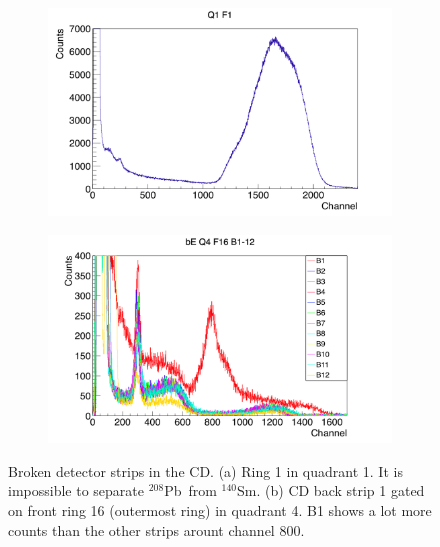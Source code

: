 \documentclass[twoside,english]{uiofysmaster/uiofysmaster}
\newcommand{\Sm}{$^{140}$Sm} %
\newcommand{\Pb}{$^{208}$Pb}
\begin{document}
\begin{figure}[ht]
	\centering
	\begin{subfigure}[t]{0.49\textwidth}
		\centering
		\includegraphics[width=\textwidth]{../Plots/plotting/TB_Q1_F1.png}
		\caption{}
		\label{fig:BDS_R1}
	\end{subfigure}
	\hfill
	\begin{subfigure}[t]{0.49\textwidth}
		\centering
		\includegraphics[width=\textwidth]{../Plots/plotting/bE_Q4_f16_b1-12.png}
		\caption{}
		\label{fig:BDS_B1}
	\end{subfigure}
	\caption{Broken detector strips in the CD.
	(a) Ring 1 in quadrant 1. It is impossible to separate \Pb\ from \Sm.
	(b) CD back strip 1 gated on front ring 16 (outermost ring) in quadrant 4. B1 shows a lot more counts than the other strips arount channel 800.}
	\label{fig:BDS}
\end{figure}
\end{document}

